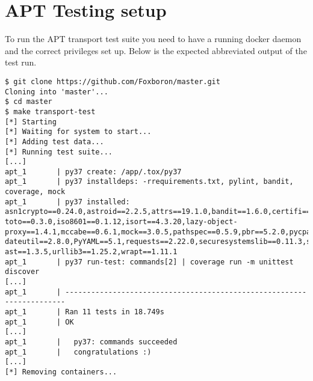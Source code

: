 \documentclass[../Main/thesis.tex]{subfiles}
\begin{document}
\chapter{APT Testing setup}%
\label{appendix:apt_testing}
To run the APT transport test suite you need to have a running docker daemon and
the correct privileges set up. Below is the expected abbreviated output of the
test run.

\begin{verbatim}
$ git clone https://github.com/Foxboron/master.git
Cloning into 'master'...
$ cd master 
$ make transport-test                                
[*] Starting
[*] Waiting for system to start...
[*] Adding test data...
[*] Running test suite...
[...]
apt_1       | py37 create: /app/.tox/py37
apt_1       | py37 installdeps: -rrequirements.txt, pylint, bandit, coverage, mock
apt_1       | py37 installed: asn1crypto==0.24.0,astroid==2.2.5,attrs==19.1.0,bandit==1.6.0,certifi==2019.3.9,cffi==1.12.3,chardet==3.0.4,colorama==0.4.1,coverage==4.5.3,cryptography==2.6.1,gitdb2==2.0.5,GitPython==2.1.11,idna==2.8,in-toto==0.3.0,iso8601==0.1.12,isort==4.3.20,lazy-object-proxy==1.4.1,mccabe==0.6.1,mock==3.0.5,pathspec==0.5.9,pbr==5.2.0,pycparser==2.19,pylint==2.3.1,PyNaCl==1.3.0,python-dateutil==2.8.0,PyYAML==5.1,requests==2.22.0,securesystemslib==0.11.3,six==1.12.0,smmap2==2.0.5,stevedore==1.30.1,typed-ast==1.3.5,urllib3==1.25.2,wrapt==1.11.1
apt_1       | py37 run-test: commands[2] | coverage run -m unittest discover
[...]
apt_1       | ----------------------------------------------------------------------
apt_1       | Ran 11 tests in 18.749s
apt_1       | OK
[...]
apt_1       |   py37: commands succeeded
apt_1       |   congratulations :)
[...]
[*] Removing containers...
\end{verbatim}
\end{document}

